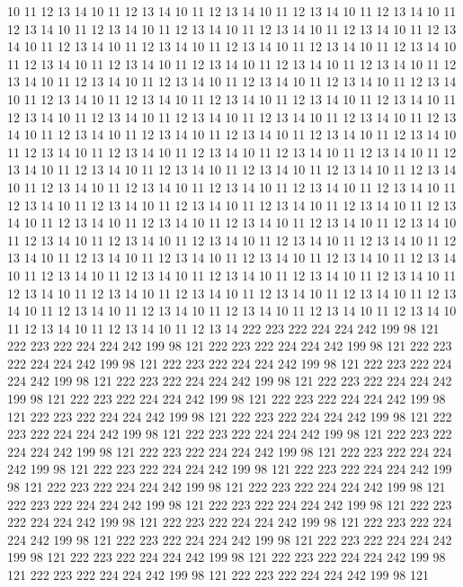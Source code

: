 10 11 12 13 14
10 11 12 13 14
10 11 12 13 14
10 11 12 13 14
10 11 12 13 14
10 11 12 13 14
10 11 12 13 14
10 11 12 13 14
10 11 12 13 14
10 11 12 13 14
10 11 12 13 14
10 11 12 13 14
10 11 12 13 14
10 11 12 13 14
10 11 12 13 14
10 11 12 13 14
10 11 12 13 14
10 11 12 13 14
10 11 12 13 14
10 11 12 13 14
10 11 12 13 14
10 11 12 13 14
10 11 12 13 14
10 11 12 13 14
10 11 12 13 14
10 11 12 13 14
10 11 12 13 14
10 11 12 13 14
10 11 12 13 14
10 11 12 13 14
10 11 12 13 14
10 11 12 13 14
10 11 12 13 14
10 11 12 13 14
10 11 12 13 14
10 11 12 13 14
10 11 12 13 14
10 11 12 13 14
10 11 12 13 14
10 11 12 13 14
10 11 12 13 14
10 11 12 13 14
10 11 12 13 14
10 11 12 13 14
10 11 12 13 14
10 11 12 13 14
10 11 12 13 14
10 11 12 13 14
10 11 12 13 14
10 11 12 13 14
10 11 12 13 14
10 11 12 13 14
10 11 12 13 14
10 11 12 13 14
10 11 12 13 14
10 11 12 13 14
10 11 12 13 14
10 11 12 13 14
10 11 12 13 14
10 11 12 13 14
10 11 12 13 14
10 11 12 13 14
10 11 12 13 14
10 11 12 13 14
10 11 12 13 14
10 11 12 13 14
10 11 12 13 14
10 11 12 13 14
10 11 12 13 14
10 11 12 13 14
10 11 12 13 14
10 11 12 13 14
10 11 12 13 14
10 11 12 13 14
10 11 12 13 14
10 11 12 13 14
10 11 12 13 14
10 11 12 13 14
10 11 12 13 14
10 11 12 13 14
10 11 12 13 14
10 11 12 13 14
10 11 12 13 14
10 11 12 13 14
10 11 12 13 14
10 11 12 13 14
10 11 12 13 14
10 11 12 13 14
10 11 12 13 14
10 11 12 13 14
10 11 12 13 14
10 11 12 13 14
10 11 12 13 14
10 11 12 13 14
10 11 12 13 14
10 11 12 13 14
10 11 12 13 14
10 11 12 13 14
10 11 12 13 14
10 11 12 13 14
222 223 222 224 224 242 199 98 121
222 223 222 224 224 242 199 98 121
222 223 222 224 224 242 199 98 121
222 223 222 224 224 242 199 98 121
222 223 222 224 224 242 199 98 121
222 223 222 224 224 242 199 98 121
222 223 222 224 224 242 199 98 121
222 223 222 224 224 242 199 98 121
222 223 222 224 224 242 199 98 121
222 223 222 224 224 242 199 98 121
222 223 222 224 224 242 199 98 121
222 223 222 224 224 242 199 98 121
222 223 222 224 224 242 199 98 121
222 223 222 224 224 242 199 98 121
222 223 222 224 224 242 199 98 121
222 223 222 224 224 242 199 98 121
222 223 222 224 224 242 199 98 121
222 223 222 224 224 242 199 98 121
222 223 222 224 224 242 199 98 121
222 223 222 224 224 242 199 98 121
222 223 222 224 224 242 199 98 121
222 223 222 224 224 242 199 98 121
222 223 222 224 224 242 199 98 121
222 223 222 224 224 242 199 98 121
222 223 222 224 224 242 199 98 121
222 223 222 224 224 242 199 98 121
222 223 222 224 224 242 199 98 121
222 223 222 224 224 242 199 98 121
222 223 222 224 224 242 199 98 121
222 223 222 224 224 242 199 98 121
222 223 222 224 224 242 199 98 121
222 223 222 224 224 242 199 98 121
